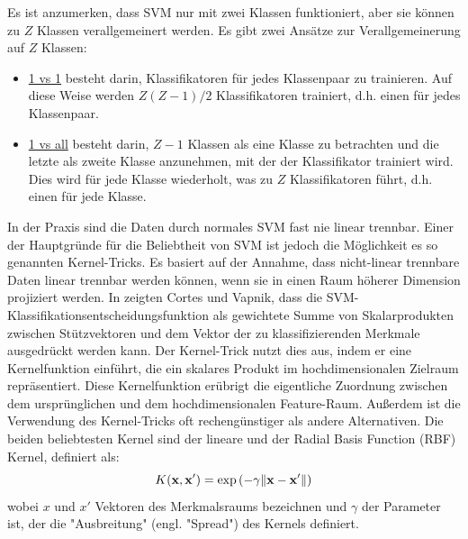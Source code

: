 Es ist anzumerken, dass SVM nur mit zwei Klassen funktioniert, aber sie k{\"o}nnen zu $ Z $ Klassen verallgemeinert werden.
Es gibt zwei Ans{\"a}tze zur Verallgemeinerung auf $ Z $ Klassen:
\begin{itemize} %
  \item \underline{1 vs 1} besteht darin, Klassifikatoren f{\"u}r jedes Klassenpaar zu trainieren. Auf diese Weise werden $ Z(Z-1)/ 2$ Klassifikatoren trainiert, d.h. einen f{\"u}r jedes Klassenpaar.
  \item \underline{1 vs all} besteht darin, $ Z-1 $ Klassen als eine Klasse zu betrachten und die letzte als zweite Klasse anzunehmen, mit der der Klassifikator trainiert wird. Dies wird f{\"u}r jede Klasse wiederholt, was zu $ Z $ Klassifikatoren f{\"u}hrt, d.h. einen f{\"u}r jede Klasse. \\
\end{itemize}

In der Praxis sind die Daten durch normales SVM fast nie linear trennbar.
Einer der Hauptgr{\"u}nde f{\"u}r die Beliebtheit von SVM ist jedoch die M{\"o}glichkeit es so genannten Kernel-Tricks.
Es basiert auf der Annahme, dass nicht-linear trennbare Daten linear trennbar werden k{\"o}nnen, wenn sie in einen Raum h{\"o}herer Dimension projiziert werden.
In \cite{svn1995} zeigten Cortes und Vapnik, dass die SVM-Klassifikationsentscheidungsfunktion als gewichtete Summe von Skalarprodukten zwischen St{\"u}tzvektoren und dem Vektor der zu klassifizierenden Merkmale ausgedr{\"u}ckt werden kann. 
Der Kernel-Trick nutzt dies aus, indem er eine Kernelfunktion einf{\"u}hrt, die ein skalares Produkt im hochdimensionalen Zielraum repr{\"a}sentiert. 
Diese Kernelfunktion er{\"u}brigt die eigentliche Zuordnung zwischen dem urspr{\"u}nglichen und dem hochdimensionalen Feature-Raum.
Au{\ss}erdem ist die Verwendung des Kernel-Tricks oft recheng{\"u}nstiger als andere Alternativen.
Die beiden beliebtesten Kernel sind der lineare und der Radial Basis Function (RBF) Kernel, definiert als: 
\begin{equation} 
\Large{ {\displaystyle K(\mathbf {x} ,\mathbf {x'} )=\exp \left(-\gamma{\|\mathbf {x} -\mathbf {x'}}\right\|)} }
\end{equation}
wobei $ x $ und $ x' $ Vektoren des Merkmalsraums bezeichnen und $ \gamma $ der Parameter ist, der die "Ausbreitung" (engl. "Spread") des Kernels definiert. \\


